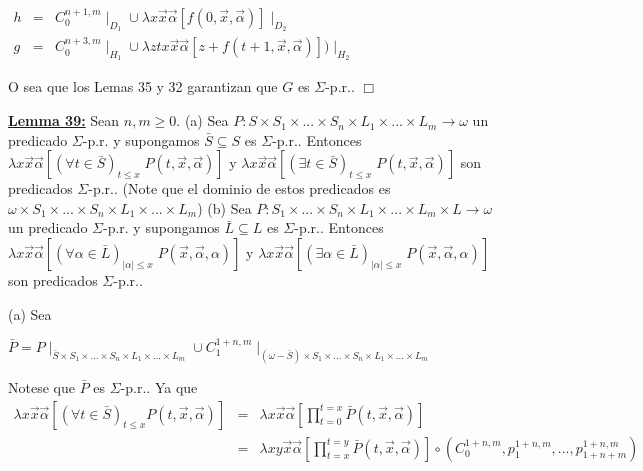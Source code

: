 \(\displaystyle \begin{array}{rcl} h & =& C_{0}^{n+1,m}\mid _{D_{1}}\cup \lambda x\vec{x}\vec{\alpha}\left[ f(0, \vec{x},\vec{\alpha})\right] \mid _{D_{2}} \\ g & =& C_{0}^{n+3,m}\mid _{H_{1}}\cup \lambda ztx\vec{x}\vec{\alpha}\left[ z+f(t+1,\vec{x},\vec{\alpha})\right] )\mid _{H_{2}} \end{array} \)

O sea que los Lemas 35 y 32 garantizan que \(G\) es \( \Sigma \)-p.r.. \(\Box\)


\textbf{\underline{Lemma 39:}} Sean \(n,m\geq 0\).
(a) Sea \(P:S\times S_{1}\times ...\times S_{n}\times L_{1}\times ...\times L_{m}\rightarrow \omega \) un predicado \(\Sigma \)-p.r. y supongamos \(\bar{S}\subseteq S\) es \(\Sigma \)-p.r.. Entonces \(\lambda x\vec{x}\vec{\alpha }\left[ (\forall t\in \bar{S})_{t\leq x}\;P(t,\vec{x},\vec{\alpha})\right] \) y \(\lambda x\vec{x}\vec{\alpha}\left[ (\exists t\in \bar{S})_{t\leq x}\;P(t, \vec{x},\vec{\alpha})\right] \) son predicados \(\Sigma \)-p.r.. (Note que el dominio de estos predicados es \(\omega \times S_{1}\times ...\times S_{n}\times L_{1}\times ...\times L_{m}\))
(b) Sea \(P:S_{1}\times ...\times S_{n}\times L_{1}\times ...\times L_{m}\times L\rightarrow \omega \) un predicado \(\Sigma \)-p.r. y supongamos \( \bar{L}\subseteq L\) es \(\Sigma \)-p.r.. Entonces \(\lambda x\vec{x}\vec{\alpha} \left[ (\forall \alpha \in \bar{L})_{\left\vert \alpha \right\vert \leq x}\;P(\vec{x},\vec{\alpha},\alpha )\right] \) y \(\lambda x\vec{x}\vec{\alpha} \left[ (\exists \alpha \in \bar{L})_{\left\vert \alpha \right\vert \leq x}\;P(\vec{x},\vec{\alpha},\alpha )\right] \) son predicados \(\Sigma \)-p.r..

\PROOF (a) Sea

\(\displaystyle \bar{P}=P\mid _{\bar{S}\times S_{1}\times ...\times S_{n}\times L_{1}\times ...\times L_{m}}\cup C_{1}^{1+n,m}\mid _{(\omega -\bar{S})\times S_{1}\times ...\times S_{n}\times L_{1}\times ...\times L_{m}} \)

Notese que \(\bar{P}\) es \(\Sigma \)-p.r.. Ya que
\(\displaystyle \begin{array}{rcl} \lambda x\vec{x}\vec{\alpha}\left[ (\forall t\in \bar{S})_{t\leq x}P(t,\vec{x },\vec{\alpha})\right] & =& \lambda x\vec{x}\vec{\alpha}\left[ \prod\limits_{t=0}^{t=x}\bar{P}(t,\vec{x},\vec{\alpha})\right] \\ & =& \lambda xy\vec{x}\vec{\alpha}\left[ \prod\limits_{t=x}^{t=y}\bar{P}(t, \vec{x},\vec{\alpha})\right] \circ \left( C_{0}^{1+n,m},p_{1}^{1+n,m},...,p_{1+n+m}^{1+n,m}\right) \end{array} \)

